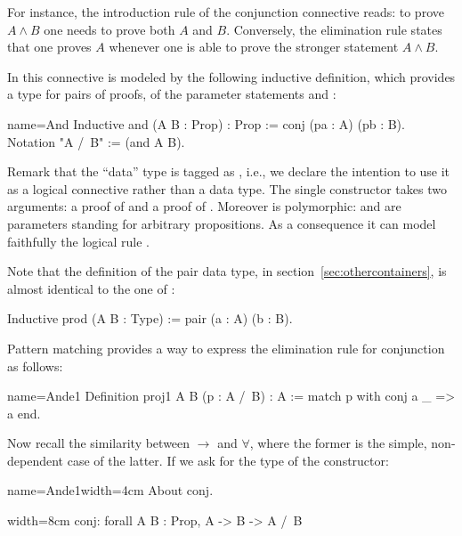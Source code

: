 For instance, the introduction rule of the conjunction
connective
reads: to prove $A \wedge B$ one needs to prove both
$A$ and $B$. Conversely, the elimination rule states that one proves 
$A$ whenever one is
able to prove the stronger statement $A \wedge B$.

In \Coq{} this connective is modeled by the following inductive
definition, which provides a type for pairs of proofs, of the
parameter statements  and :

\begin{coq}{name=And}{}
Inductive and (A B : Prop) : Prop := conj (pa : A) (pb : B).
Notation "A /\ B" := (and A B).
\end{coq}

Remark that the ``data'' type  is tagged as , i.e.,  we declare
the intention to use it as a logical connective rather than a data type.  The
single constructor  takes two
arguments: a proof of  and a proof of .
Moreover  is polymorphic:
 and  are parameters standing for arbitrary propositions.
As a consequence it can model faithfully the logical rule .

Note that the definition of the pair data type,
in section~\ref{sec:othercontainers}, is almost identical to the one
of :

\begin{coq}{}{}
Inductive prod (A B : Type) := pair (a : A) (b : B).
\end{coq}

Pattern matching provides a way to express the elimination rule for
conjunction as follows:

\begin{coq}{name=Ande1}{}
Definition proj1 A B (p : A /\ B) : A :=
  match p with conj a _ => a end.
\end{coq}

Now recall the similarity between $\to$ and $\forall$, where the former is the
simple, non-dependent case of the latter.  If we ask for the type of
the  constructor:

\begin{coq-left}{name=Ande1}{width=4cm}
About conj.
\end{coq-left}
\begin{coqout-right}{}{width=8cm}
conj: forall A B : Prop, A -> B -> A /\ B
\end{coqout-right}

